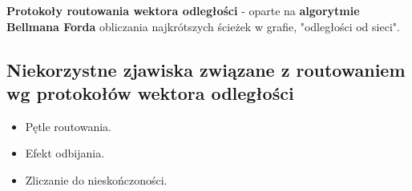\documentclass[../main.tex]{subfiles}
\begin{document}
    \textbf{Protokoły routowania wektora odległości} - oparte na \textbf{algorytmie Bellmana Forda} obliczania najkrótszych ścieżek w grafie, "odległości od sieci".\\


    \subsection{Niekorzystne zjawiska związane z routowaniem wg protokołów wektora odległości}
    \begin{itemize}
        \item Pętle routowania.
        \item Efekt odbijania.
        \item Zliczanie do nieskończoności.
    \end{itemize}
\end{document}
